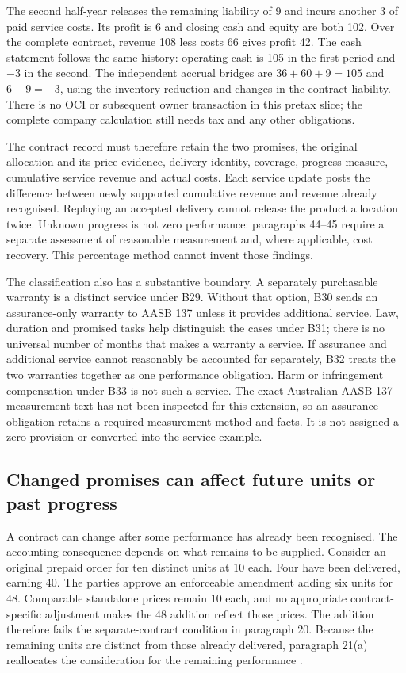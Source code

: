 The second half-year releases the remaining liability of 9 and incurs another
3 of paid service costs. Its profit is 6 and closing cash and equity are both
102. Over the complete contract, revenue 108 less costs 66 gives profit 42.
The cash statement follows the same history: operating cash is 105 in the
first period and $-3$ in the second. The independent accrual bridges are
$36+60+9=105$ and $6-9=-3$, using the inventory reduction and changes in the
contract liability. There is no OCI or subsequent owner transaction in this
pretax slice; the complete company calculation still needs tax and any other
obligations.

The contract record must therefore retain the two promises, the original
allocation and its price evidence, delivery identity, coverage, progress
measure, cumulative service revenue and actual costs. Each service update
posts the difference between newly supported cumulative revenue and revenue
already recognised. Replaying an accepted delivery cannot release the product
allocation twice. Unknown progress is not zero performance: paragraphs 44--45
require a separate assessment of reasonable measurement and, where applicable,
cost recovery. This percentage method cannot invent those findings.

The classification also has a substantive boundary. A separately purchasable
warranty is a distinct service under B29. Without that option, B30 sends an
assurance-only warranty to AASB 137 unless it provides additional service.
Law, duration and promised tasks help distinguish the cases under B31; there
is no universal number of months that makes a warranty a service. If assurance
and additional service cannot reasonably be accounted for separately, B32
treats the two warranties together as one performance obligation. Harm or
infringement compensation under B33 is not such a service. The exact Australian
AASB 137 measurement text has not been inspected for this extension, so an
assurance obligation retains a required measurement method and facts. It is
not assigned a zero provision or converted into the service example.

\subsection{Changed promises can affect future units or past progress}
\label{sec:customer-modification}

A contract can change after some performance has already been recognised.
The accounting consequence depends on what remains to be supplied. Consider
an original prepaid order for ten distinct units at 10 each. Four have been
delivered, earning 40. The parties approve an enforceable amendment adding
six units for 48. Comparable standalone prices remain 10 each, and no
appropriate contract-specific adjustment makes the 48 addition reflect
those prices. The addition therefore fails the separate-contract condition
in paragraph 20. Because the remaining units are distinct from those already
delivered, paragraph 21(a) reallocates the consideration for the remaining
performance \citep{aasb15dated}.

